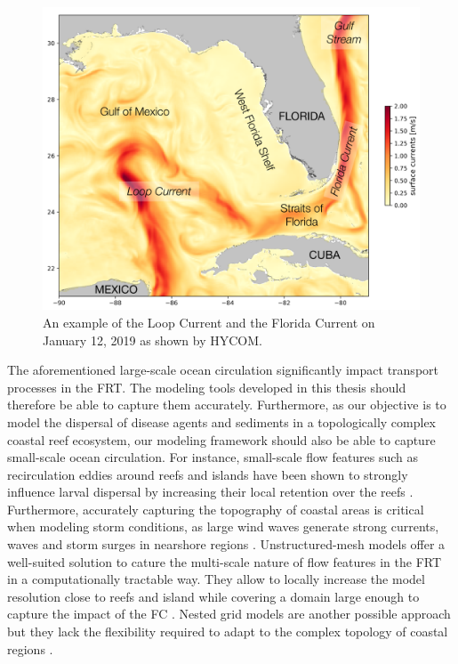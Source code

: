 \begin{figure}
	\centering
	\includegraphics[width=.9\textwidth]{chapters/intro/figures/fig_gom.png}
	\caption{An example of the Loop Current and the Florida Current on January 12, 2019 as shown by HYCOM.}
	\label{intro:gom}
\end{figure}

The aforementioned large-scale ocean circulation significantly impact transport processes in the FRT. The modeling tools developed in this thesis should therefore be able to capture them accurately. Furthermore, as our objective is to model the dispersal of disease agents and sediments in a topologically complex coastal reef ecosystem, our modeling framework should also be able to capture small-scale ocean circulation. For instance, small-scale flow features such as recirculation eddies around reefs and islands have been shown to strongly influence larval dispersal by increasing their local retention over the reefs \citep{figueiredo2013synthesizing}. Furthermore, accurately capturing the topography of coastal areas is critical when modeling storm conditions, as large wind waves generate strong currents, waves and storm surges in nearshore regions \citep{dietrich2010high, weisberg2006hurricane}. Unstructured-mesh models offer a well-suited solution to cature the multi-scale nature of flow features in the FRT in a computationally tractable way. They allow to locally increase the model resolution close to reefs and island while covering a domain large enough to capture the impact of the FC \citep{lambrechts2008multi,frys2020fine}. Nested grid models are another possible approach \citep{warner2010development} but they lack the flexibility required to adapt to the complex topology of coastal regions \citep{fringer2019future}.

